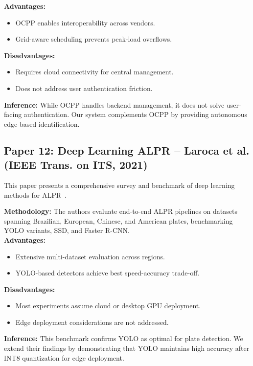 \documentclass[11pt]{report}
\begin{document}
\textbf{Advantages:}
\begin{itemize}
    \item OCPP enables interoperability across vendors.
    \item Grid-aware scheduling prevents peak-load overflows.
\end{itemize}

\textbf{Disadvantages:}
\begin{itemize}
    \item Requires cloud connectivity for central management.
    \item Does not address user authentication friction.
\end{itemize}

\textbf{Inference:}
While OCPP handles backend management, it does not solve user-facing authentication. Our system complements OCPP by providing autonomous edge-based identification.

\subsection{Paper 12: Deep Learning ALPR -- Laroca et al. (IEEE Trans. on ITS, 2021)}
This paper presents a comprehensive survey and benchmark of deep learning methods for ALPR~\cite{laroca2021}. \par

\textbf{Methodology:} The authors evaluate end-to-end ALPR pipelines on datasets spanning Brazilian, European, Chinese, and American plates, benchmarking YOLO variants, SSD, and Faster R-CNN. \\

\textbf{Advantages:}
\begin{itemize}
    \item Extensive multi-dataset evaluation across regions.
    \item YOLO-based detectors achieve best speed-accuracy trade-off.
\end{itemize}

\textbf{Disadvantages:}
\begin{itemize}
    \item Most experiments assume cloud or desktop GPU deployment.
    \item Edge deployment considerations are not addressed.
\end{itemize}

\textbf{Inference:}
This benchmark confirms YOLO as optimal for plate detection. We extend their findings by demonstrating that YOLO maintains high accuracy after INT8 quantization for edge deployment.
\end{document}

